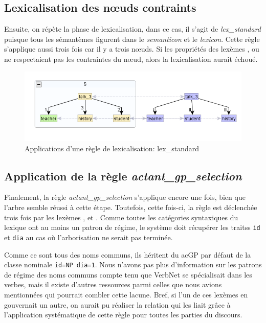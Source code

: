 \subsection{Lexicalisation des n\oe{}uds contraints}
Ensuite, on répète la phase de lexicalisation, dans ce cas, il s'agit de \emph{lex\_standard} puisque tous les sémantèmes figurent dans le \emph{semanticon} et le \emph{lexicon}. Cette règle s'applique aussi trois fois car il y a trois n\oe{}uds. Si les propriétés des lexèmes ,  ou  ne respectaient pas les contraintes du n\oe{}ud, alors la lexicalisation aurait échoué.
\begin{figure}[htb]
	\centering
	\includegraphics[width=1\textwidth, trim = {0cm 0cm 0cm 0cm},clip]{ch6/figs/lex.png}
	\caption{Applications d'une règle de lexicalisation: lex\_standard}
	\label{deroulement3}
\end{figure}

\subsection{Application de la règle \emph{actant\_gp\_selection}}
Finalement, la règle \emph{actant\_gp\_selection} s'applique encore une fois, bien que l'arbre semble réussi à cette étape. Toutefois, cette fois-ci, la règle est déclenchée trois fois par les lexèmes , et . Comme toutes les catégories syntaxiques du lexique ont au moins un patron de régime, le système doit récupérer les traitss \texttt{id} et \texttt{dia} au cas où l'arborisation ne serait pas terminée. 

Comme ce sont tous des noms communs, ils héritent du ac{GP} par défaut de la classe nominale \texttt{id=NP dia=1}. Nous n'avons pas plus d'information sur les patrons de régime des noms communs compte tenu que VerbNet se spécialisait dans les verbes, mais il existe d'autres ressources parmi celles que nous avions mentionnées qui pourrait combler cette lacune. Bref, si l'un de ces lexèmes en gouvernait un autre, on aurait pu réaliser la relation qui les liait grâce à l'application systématique de cette règle pour toutes les parties du discours.

